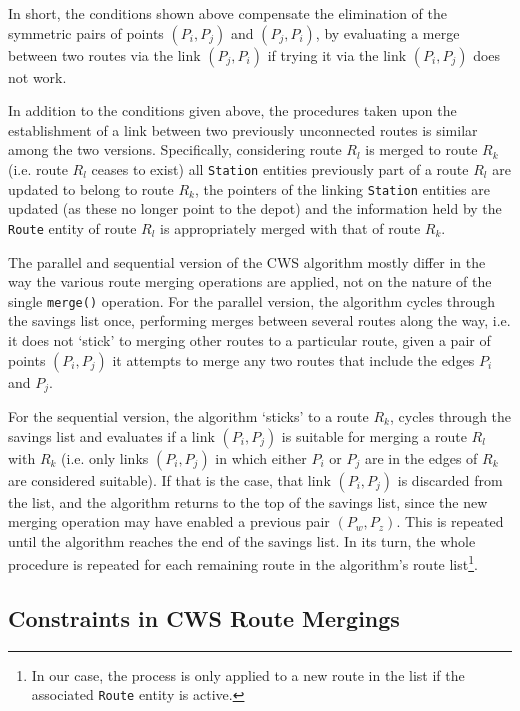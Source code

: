 In short, the conditions shown above compensate the elimination of the symmetric 
pairs of points $(P_i,P_j)$ and $(P_j,P_i)$, by evaluating a merge between two routes 
via the link $(P_j,P_i)$ if trying it via the link $(P_i,P_j)$ does not work.\vertbreak

In addition to the conditions given above, the procedures taken upon the 
establishment of a link between two previously unconnected routes is similar 
among the two versions. Specifically, considering route $R_l$ is merged to route 
$R_k$ (i.e. route $R_l$ ceases to exist) all \verb?Station? entities previously 
part of a route $R_l$ are updated to belong to route $R_k$, the pointers of the 
linking \verb?Station? entities are updated (as these no longer point to the 
depot) and the information held by the \verb?Route? entity of route $R_l$ is 
appropriately merged with that of route $R_k$.\vertbreak

The parallel and sequential version of the CWS algorithm mostly differ in the 
way the various route merging operations are applied, not on the nature of 
the single \verb+merge()+ operation. For the parallel version, the algorithm cycles 
through the savings list once, performing merges between several routes 
along the way, i.e. it does not `stick' to merging other routes to a particular 
route, given a pair of points $(P_i,P_j)$ it attempts to merge any two routes that 
include the edges $P_i$ and $P_j$.\vertbreak

For the sequential version, the algorithm `sticks' to a route $R_k$, cycles 
through the savings list and evaluates if a link $(P_i,P_j)$ is suitable for 
merging a route $R_l$ with $R_k$ (i.e. only links $(P_i,P_j)$ in which either $P_i$ 
or $P_j$ are in the edges of $R_k$ are considered suitable). If that is the case, 
that link $(P_i,P_j)$ is discarded from the list, and the algorithm returns to the 
top of the savings list, since the new merging operation may have enabled a 
previous pair $(P_w,P_z)$. This is repeated until the algorithm reaches the end of 
the savings list. In its turn, the whole procedure is repeated for each 
remaining route in the algorithm's route list\cprotect\footnote{In our case, 
the process 
is only applied to a new route in the list if the associated \verb?Route? 
entity is active.}.

\subsection{Constraints in CWS Route Mergings}
\label{subsec:const}

